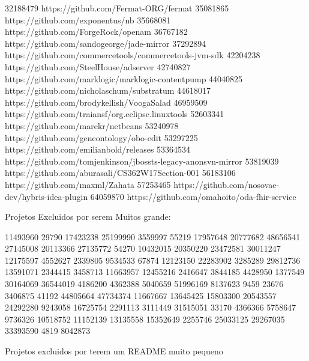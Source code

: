 32188479	https://github.com/Fermat-ORG/fermat
35081865	https://github.com/exponentus/nb
35668081	https://github.com/ForgeRock/openam
36767182	https://github.com/sandogeorge/jade-mirror
37292894	https://github.com/commercetools/commercetools-jvm-sdk
42204238	https://github.com/SteelHouse/adserver
42740827	https://github.com/marklogic/marklogic-contentpump
44040825	https://github.com/nicholaschum/substratum
44618017	https://github.com/brodykellish/VoogaSalad
46959509	https://github.com/traiansf/org.eclipse.linuxtools
52603341	https://github.com/marekr/netbeans
53240978	https://github.com/geneontology/obo-edit
53297225	https://github.com/emilianbold/releases
53364534	https://github.com/tomjenkinson/jbossts-legacy-anonsvn-mirror
53819039	https://github.com/aburasali/CS362W17Section-001
56183106	https://github.com/maxml/Zahata
57253465	https://github.com/nosovae-dev/hybris-idea-plugin
64059870	https://github.com/omahoito/oda-fhir-service

Projetos  Excluidos por serem  Muitos grande:

11493960
29790
17423238
25199990
3559997
55219
17957648
20777682
48656541
27145008
20113366
27135772
54270
10432015
20350220
23472581
30011247
12175597
4552627
2339805
9534533
67874
12123150
22283902
3285289
29812736
13591071
2344415
3458713
11663957
12455216
2416647
3844185
4428950
1377549
30164069
36544019
4186200
4362388
5040659
51996169
8137623
9459
23676
3406875
41192
44805664
47734374
11667667
13645425
15803300
20543557
24292280
9243058
16725754
2291113
3111449
31515051
33170
4366366
5758647
9736326
10518752
11152139
13135558
15352649
2255746
25033125
29267035
33393590
4819
8042873


Projetos excluidos por terem um README muito pequeno

